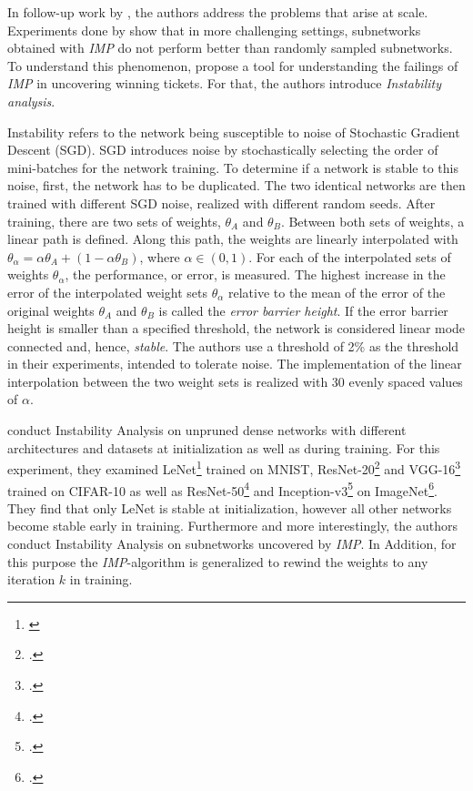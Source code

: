 In follow-up work by \textcite{LinearModeConnectivity}, the authors address the problems that arise at scale. Experiments done by \textcite{Liu19, Gale19} show that in more challenging settings, subnetworks obtained with \textit{IMP} do not perform better than randomly sampled subnetworks. To understand this phenomenon, \textcite{LinearModeConnectivity} propose a tool for understanding the failings of \textit{IMP} in uncovering winning tickets. For that, the authors introduce \textit{Instability analysis}.

Instability refers to the network being susceptible to noise of Stochastic Gradient Descent (SGD).
SGD introduces noise by stochastically selecting the order of mini-batches for the network training.
To determine if a network is stable to this noise, first, the network has to be duplicated.
The two identical networks are then trained with different SGD noise, realized with different random seeds.
After training, there are two sets of weights, $\theta_A$ and $\theta_B$.
Between both sets of weights, a linear path is defined. Along this path, the weights are linearly interpolated with $\theta_\alpha = \alpha \theta_A + (1 - \alpha \theta_B)$, where $\alpha \in (0,1)$. 
For each of the interpolated sets of weights $\theta_\alpha$, the performance, or error, is measured.
The highest increase in the error of the interpolated weight sets $\theta_\alpha$ relative to the mean of the error of the original weights $\theta_A$ and $\theta_B$ is called the \textit{error barrier height}. 
If the error barrier height is smaller than a specified threshold, the network is considered linear mode connected and, hence, \textit{stable}.
The authors use a threshold of 2\% as the threshold in their experiments, intended to tolerate noise. The implementation of the linear interpolation between the two weight sets is realized with 30 evenly spaced values of $\alpha$.

\textcite{LinearModeConnectivity} conduct Instability Analysis on unpruned dense networks with different architectures and datasets at initialization as well as during training. For this experiment, they examined LeNet\footnote{\cite{cnn}} trained on MNIST, ResNet-20\footcite{ResidualConnect} and VGG-16\footcite{SimonyanZisserman} trained on CIFAR-10 as well as ResNet-50\footcite{ResidualConnect} and Inception-v3\footcite{inceptionv3} on ImageNet\footcite{imagenet}. They find that only LeNet is stable at initialization, however all other networks become stable early in training.
Furthermore and more interestingly, the authors conduct Instability Analysis on subnetworks uncovered by \textit{IMP}.
In Addition, for this purpose the \textit{IMP}-algorithm is generalized to rewind the weights to any iteration $k$ in training.

